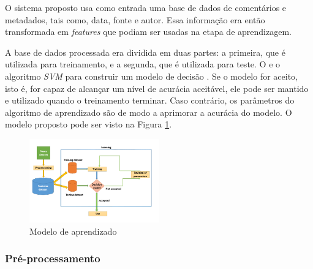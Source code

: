 O sistema proposto usa como entrada uma base de dados de comentários e metadados, tais como, data, fonte e autor. 
Essa informação era então transformada em \textit{features} que podiam ser usadas na etapa de aprendizagem. 

A base de dados processada era dividida em duas partes: a primeira, que é utilizada para treinamento, e a segunda, que é utilizada para teste. 
O  e o algoritmo \textit{SVM} para construir um modelo de decisão . Se o modelo for aceito, isto é, for capaz de alcançar um nível de acurácia aceitável, ele pode ser mantido e utilizado quando o treinamento terminar. Caso contrário, os parâmetros do algoritmo de aprendizado são  de modo a aprimorar a acurácia do modelo. O modelo proposto pode ser visto na Figura \ref{fig:mesh1}.

\begin{figure}[h]
    \centering
    \includegraphics[width=0.5\textwidth]{Imagens/revisao informal/modelo1.png}
    \caption{Modelo de aprendizado}
    \label{fig:mesh1}
\end{figure}

\subsubsection{Pré-processamento}

